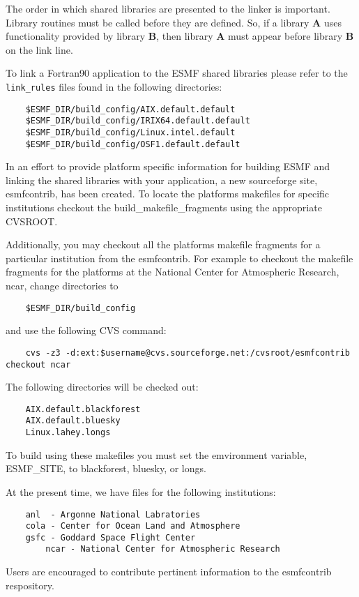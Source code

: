The order in which shared libraries are presented to 
the linker is important. Library routines must be called before they are 
defined. So, if a library {\bf A} uses functionality provided by library 
{\bf B}, then library {\bf A} must appear before library {\bf B} on the link line. 

To link a Fortran90 application to the ESMF shared libraries please refer to the
{\tt link\_rules} files found in the following directories:


\begin{verbatim}
	$ESMF_DIR/build_config/AIX.default.default
	$ESMF_DIR/build_config/IRIX64.default.default
	$ESMF_DIR/build_config/Linux.intel.default
	$ESMF_DIR/build_config/OSF1.default.default
\end{verbatim}

In an effort to provide platform specific information for building ESMF and linking the
shared libraries with your application, a new sourceforge site, esmfcontrib, has been created.
To locate the platforms makefiles for specific institutions checkout the build\_makefile\_fragments
using the appropriate CVSROOT.

Additionally, you may checkout all the platforms makefile fragments for a particular institution
from the esmfcontrib. For example to checkout the makefile fragments for the platforms at the
National Center for Atmospheric Research, ncar, change directories to

\begin{verbatim}
 	$ESMF_DIR/build_config
\end{verbatim}

and use the following CVS command:

\begin{verbatim}
	cvs -z3 -d:ext:$username@cvs.sourceforge.net:/cvsroot/esmfcontrib checkout ncar
\end{verbatim}

The following directories will be checked out:

\begin{verbatim}
	AIX.default.blackforest
	AIX.default.bluesky
	Linux.lahey.longs
\end{verbatim}

To build using these makefiles you must set the emvironment variable, ESMF_SITE, to blackforest, bluesky, or longs.

At the present time, we have files for the following institutions:

\begin{verbatim}
	anl  - Argonne National Labratories
	cola - Center for Ocean Land and Atmosphere
	gsfc - Goddard Space Flight Center
        ncar - National Center for Atmospheric Research
\end{verbatim}


Users are encouraged to contribute pertinent information to the esmfcontrib respository.





